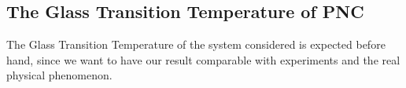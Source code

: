 \subsection*{The Glass Transition Temperature of PNC}
The Glass Transition Temperature of the system considered is expected before hand, since we want to have our result comparable with experiments and the real physical phenomenon.

